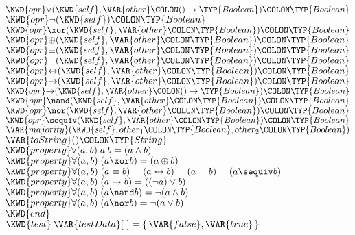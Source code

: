 \begin{Fortress}
\(  \KWD{opr} \mathord{\vee}(\KWD{self}, \VAR{other}\COLON ()\rightarrow\TYP{Boolean})\COLON \TYP{Boolean}\)\\
\(  \KWD{opr} \mathord{\neg}(\KWD{self})\COLON \TYP{Boolean}\)\\
\(  \KWD{opr} \mathord{\xor}(\KWD{self}, \VAR{other}\COLON \TYP{Boolean})\COLON \TYP{Boolean}\)\\
\(  \KWD{opr} \mathord{\oplus}(\KWD{self}, \VAR{other}\COLON \TYP{Boolean})\COLON \TYP{Boolean}\)\\
\(  \KWD{opr} \mathord{\equiv}(\KWD{self}, \VAR{other}\COLON \TYP{Boolean})\COLON \TYP{Boolean}\)\\
\(  \KWD{opr} \mathord{=}(\KWD{self}, \VAR{other}\COLON \TYP{Boolean})\COLON \TYP{Boolean}\)\\
\(  \KWD{opr} \mathord{\leftrightarrow}(\KWD{self}, \VAR{other}\COLON \TYP{Boolean})\COLON \TYP{Boolean}\)\\
\(  \KWD{opr} \mathord{\rightarrow}(\KWD{self}, \VAR{other}\COLON \TYP{Boolean})\COLON \TYP{Boolean}\)\\
\(  \KWD{opr} \mathord{\rightarrow}(\KWD{self}, \VAR{other}\COLON ()\rightarrow\TYP{Boolean})\COLON \TYP{Boolean}\)\\
\(  \KWD{opr} \mathord{\nand}(\KWD{self}, \VAR{other}\COLON \TYP{Boolean})\COLON  \TYP{Boolean}\)\\
\(  \KWD{opr} \mathord{\nor}(\KWD{self}, \VAR{other}\COLON \TYP{Boolean})\COLON  \TYP{Boolean}\)\\
\(  \KWD{opr} \mathord{\sequiv}(\KWD{self}, \VAR{other}\COLON \TYP{Boolean})\COLON \TYP{Boolean}\)\\
\(  \VAR{majority}(\KWD{self}, {other}_{1}\COLON \TYP{Boolean}, {other}_{2}\COLON \TYP{Boolean})\)\\
\(  \VAR{toString}()\COLON \TYP{String}\)\\
\(  \KWD{property} \forall (a, b)\; a\:b = (a \wedge b)\)\\
\(  \KWD{property} \forall (a, b)\; (a \xor b) = (a \oplus b)\)\\
\(  \KWD{property} \forall (a, b)\; (a \equiv b) = (a \leftrightarrow b) = (a = b) = (a \sequiv b)\)\\
\(  \KWD{property} \forall (a, b)\; (a \rightarrow b) = ((\neg a) \vee b)\)\\
\(  \KWD{property} \forall (a, b)\; (a \nand b) = \neg (a \wedge b)\)\\
\(  \KWD{property} \forall (a, b)\; (a \nor b) = \neg (a \vee b)\)\-\\\poptabs
\(\KWD{end}\)\\
\(\KWD{test}\:\VAR{testData}[~] = \{\,\VAR{false}, \VAR{true}\,\}\)
\end{Fortress}




